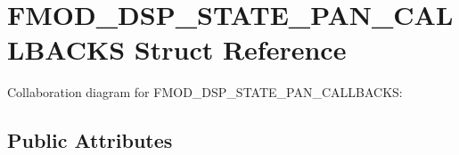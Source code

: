 \hypertarget{struct_f_m_o_d___d_s_p___s_t_a_t_e___p_a_n___c_a_l_l_b_a_c_k_s}{\section{F\+M\+O\+D\+\_\+\+D\+S\+P\+\_\+\+S\+T\+A\+T\+E\+\_\+\+P\+A\+N\+\_\+\+C\+A\+L\+L\+B\+A\+C\+K\+S Struct Reference}
\label{struct_f_m_o_d___d_s_p___s_t_a_t_e___p_a_n___c_a_l_l_b_a_c_k_s}
}


Collaboration diagram for F\+M\+O\+D\+\_\+\+D\+S\+P\+\_\+\+S\+T\+A\+T\+E\+\_\+\+P\+A\+N\+\_\+\+C\+A\+L\+L\+B\+A\+C\+K\+S\+:
\subsection*{Public Attributes}
